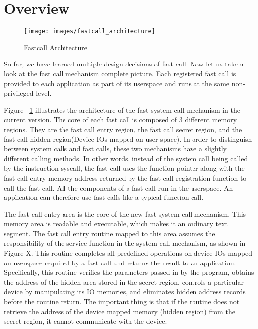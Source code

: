 \section{Overview}
\begin{figure}[tbp]
  \centering
  \texttt{[image: images/fastcall\_architecture]}
  \caption[Short description]{Fastcall Architecture}
  \label{fig:fastcall_architecture}
\end{figure}



So far, we have learned multiple design decisions of fast call. Now let us take a look at the fast call mechanism complete picture. Each registered fast call is provided to each application as part of its userspace and runs at the same non-privileged level.

Figure ~\ref{fig:fastcall_architecture} illustrates the architecture of the fast system call mechanism in the current version. The core of each fast call is composed of 3 different memory regions. They are the fast call entry region, the fast call secret region, and the fast call hidden region(Device IOs mapped on user space). In order to distinguish between system calls and fast calls, these two mechanisms have a slightly different calling methods. In other words, instead of the system call being called by the instruction syscall, the fast call uses the function pointer along with the fast call entry memory address returned by the fast call registration function to call the fast call. All the components of a fast call run in the userspace. An application can therefore use fast calls like a typical function call.

The fast call entry area is the core of the new fast system call mechanism. This memory area is readable and executable, which makes it an ordinary text segment. The fast call entry routine mapped to this area assumes the responsibility of the service function in the system call mechanism, as shown in Figure X. This routine completes all predefined operations on device IOs mapped on userspace required by a fast call and returns the result to an application. Specifically, this routine verifies the parameters passed in by the program, obtains the address of the hidden area stored in the secret region, controls a particular device by manipulating its IO memories, and eliminates hidden address records before the routine return. The important thing is that if the routine does not retrieve the address of the device mapped memory (hidden region) from the secret region, it cannot communicate with the device.

